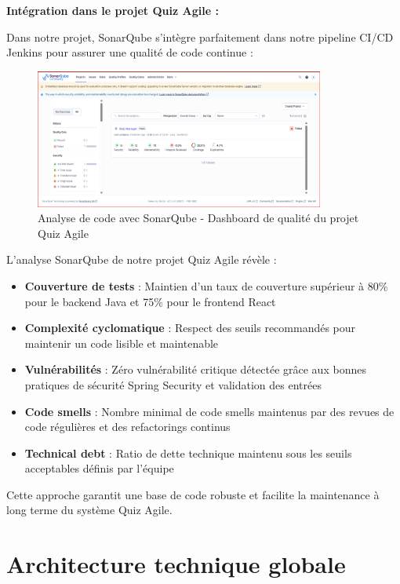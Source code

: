 \documentclass[12pt,a4paper]{report}
\begin{document}
\textbf{Intégration dans le projet Quiz Agile :}

Dans notre projet, SonarQube s'intègre parfaitement dans notre pipeline CI/CD Jenkins pour assurer une qualité de code continue :

\begin{figure}[htbp]
    \centering
    \includegraphics[width=0.85\textwidth]{latex_media/media/Analyse de code avec SonarQube.png}
    \caption{Analyse de code avec SonarQube - Dashboard de qualité du projet Quiz Agile}
    \label{fig:sonarqube-analysis}
\end{figure}

L'analyse SonarQube de notre projet Quiz Agile révèle :
\begin{itemize}
    \item \textbf{Couverture de tests} : Maintien d'un taux de couverture supérieur à 80\% pour le backend Java et 75\% pour le frontend React
    \item \textbf{Complexité cyclomatique} : Respect des seuils recommandés pour maintenir un code lisible et maintenable
    \item \textbf{Vulnérabilités} : Zéro vulnérabilité critique détectée grâce aux bonnes pratiques de sécurité Spring Security et validation des entrées
    \item \textbf{Code smells} : Nombre minimal de code smells maintenus par des revues de code régulières et des refactorings continus
    \item \textbf{Technical debt} : Ratio de dette technique maintenu sous les seuils acceptables définis par l'équipe
\end{itemize}

Cette approche garantit une base de code robuste et facilite la maintenance à long terme du système Quiz Agile.

\section{Architecture technique globale}
\end{document}
